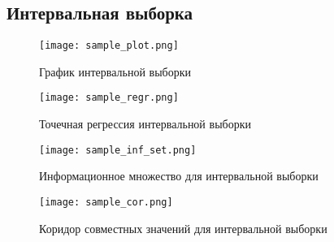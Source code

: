 \documentclass[12pt,a4paper]{article}
\begin{document}
            \subsection{Интервальная выборка}
                \begin{figure}[h!]
                    \centering
                    \texttt{[image: sample\_plot.png]}
                    \caption{График интервальной выборки}
                \end{figure}
                \FloatBarrier
                
                \begin{figure}[h!]
                    \centering
                    \texttt{[image: sample\_regr.png]}
                    \caption{Точечная регрессия интервальной выборки}
                \end{figure}
                \FloatBarrier
                
                \begin{figure}[h!]
                    \centering
                    \texttt{[image: sample\_inf\_set.png]}
                    \caption{Информационное множество для интервальной выборки}
                \end{figure}
                \FloatBarrier
    
                \begin{figure}[h!]
                    \centering
                    \texttt{[image: sample\_cor.png]}
                    \caption{Коридор совместных значений для интервальной выборки}
                \end{figure}
                \FloatBarrier
\end{document}
